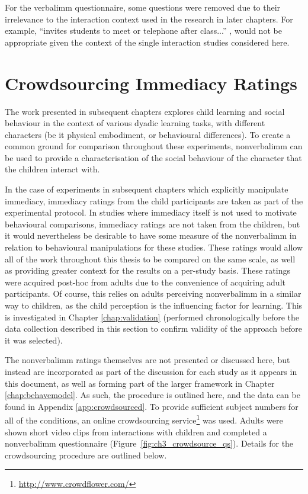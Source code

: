 For the \gls{verbalimm} questionnaire, some questions were removed due to their irrelevance to the interaction context used in the research in later chapters. For example, ``invites students to meet or telephone after class...'' \citep{gorham1988relationship}, would not be appropriate given the context of the single interaction studies considered here.

\section{Crowdsourcing Immediacy Ratings}\label{sec:method-crowdsource}
The work presented in subsequent chapters explores child learning and social behaviour in the context of various dyadic learning tasks, with different characters (be it physical embodiment, or behavioural differences). To create a common ground for comparison throughout these experiments, \gls{nonverbalimm} can be used to provide a characterisation of the social behaviour of the character that the children interact with.

In the case of experiments in subsequent chapters which explicitly manipulate \gls{immediacy}, immediacy ratings from the child participants are taken as part of the experimental protocol. In studies where \gls{immediacy} itself is not used to motivate behavioural comparisons, \gls{immediacy} ratings are not taken from the children, but it would nevertheless be desirable to have some measure of the \gls{nonverbalimm} in relation to behavioural manipulations for these studies. These ratings would allow all of the work throughout this thesis to be compared on the same scale, as well as providing greater context for the results on a per-study basis. These ratings were acquired post-hoc from adults due to the convenience of acquiring adult participants. Of course, this relies on adults perceiving \gls{nonverbalimm} in a similar way to children, as the child perception is the influencing factor for learning. This is investigated in Chapter \ref{chap:validation} (performed chronologically before the data collection described in this section to confirm validity of the approach before it was selected).

The \gls{nonverbalimm} ratings themselves are not presented or discussed here, but instead are incorporated as part of the discussion for each study as it appears in this document, as well as forming part of the larger framework in Chapter \ref{chap:behavemodel}. As such, the procedure is outlined here, and the data can be found in Appendix \ref{app:crowdsourced}. To provide sufficient subject numbers for all of the conditions, an online crowdsourcing service\footnote{\url{http://www.crowdflower.com/}} was used. Adults were shown short video clips from interactions with children and completed a \gls{nonverbalimm} questionnaire (Figure~\ref{fig:ch3_crowdsource_qs}). Details for the crowdsourcing procedure are outlined below.

